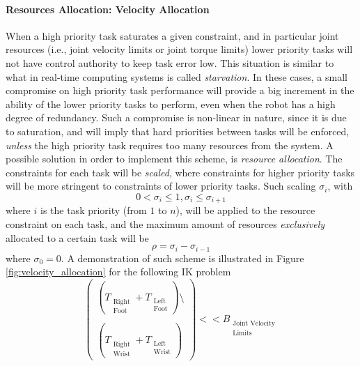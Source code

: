 \paragraph{Resources Allocation: Velocity Allocation}
\label{velocity_allocation}
When a high priority task saturates a given constraint, and in particular joint resources (i.e., joint velocity limits or joint torque limits) lower priority tasks will not have control authority to keep task error low. This situation is similar to what in real-time computing systems is called \emph{starvation}. In these cases, a small compromise on high priority task performance will provide a big increment in the ability of the lower priority tasks to perform, even when the robot has a high degree of redundancy. Such a compromise is non-linear in nature, since it is due to saturation, and will imply that hard priorities between tasks will be enforced, \emph{unless} the high priority task requires too many resources from the system. A possible solution in order to implement this scheme, is \emph{resource allocation}. The constraints for each task will be \emph{scaled}, where constraints for higher priority tasks will be more stringent to constraints of lower priority tasks. Such scaling $\sigma_i$, with
\begin{equation}
0 < \sigma_i \leq 1, \sigma_i \leq \sigma_{i+1}
\label{eq:scaling_relation}
\end{equation}
where $i$ is the task priority (from $1$ to $n$), will be applied to the resource constraint on each task, and the maximum amount of resources \emph{exclusively} allocated to a certain task will be 
\begin{equation}
\rho = \sigma_i-\sigma_{i-1}
\end{equation}
where $\sigma_0 = 0$. A demonstration of such scheme is illustrated in Figure \ref{fig:velocity_allocation} for the following IK problem 
\begin{equation}
\begin{pmatrix}
\left(T_{\substack{\text{Right}\\\text{Foot}}} + T_{\substack{\text{Left}\\\text{Foot}}}\right)\setminus\\
\\
\left(T_{\substack{\text{Right}\\\text{Wrist}}} + T_{\substack{\text{Left}\\\text{Wrist}}}\right)
\end{pmatrix}
<< B_{\substack{\text{Joint Velocity}\\\text{Limits}}}
\end{equation}

